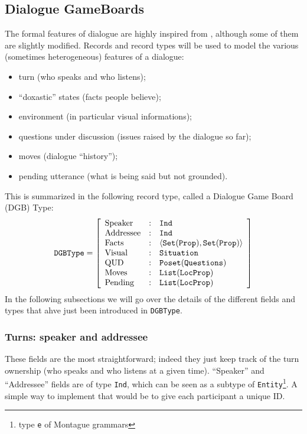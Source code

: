 \documentclass[11pt]{article}
\begin{document}
		\subsection{Dialogue GameBoards}
			The formal features of dialogue are highly inspired from \cite{ginzburg2012,ginzburg2017}, although some of them are slightly modified.
			Records and record types will be used to model the various (sometimes heterogeneous) features of a dialogue:
			\begin{itemize}
				\item turn (who speaks and who listens); \vspace{-2mm}
				\item ``doxastic'' states (facts people believe); \vspace{-2mm}
				\item environment (in particular visual informations); \vspace{-2mm}
				\item questions under discussion (issues raised by the dialogue so far); \vspace{-2mm}
				\item moves (dialogue ``history''); \vspace{-2mm}
				\item pending utterance (what is being said but not grounded).
			\end{itemize}
			This is summarized in the following record type, called a Dialogue Game Board (DGB) Type:
			\begin{equation*}
				\texttt{DGBType} =
				\left[
				\begin{array}{l l l}
				\mbox{Speaker}  &:& \texttt{Ind} \\
				\mbox{Addressee} &:& \texttt{Ind} \\
				\mbox{Facts} &:& \langle \texttt{Set}(\texttt{Prop}), \texttt{Set}(\texttt{Prop}) \rangle \\
				\mbox{Visual} &:& \texttt{Situation} \\
				\mbox{QUD}  &:& \texttt{Poset}(\texttt{Questions})\\
				\mbox{Moves}  &:& \texttt{List}(\texttt{LocProp})\\
				\mbox{Pending} &:& \texttt{List}(\texttt{LocProp})
				\end{array}
				\right ]
				\label{dgb_type}
			\end{equation*}
			In the following subsections we will go over the details of the different fields and types that ahve just been introduced in \texttt{DGBType}.
			\subsubsection{Turns: speaker and addressee}
				These fields are the most straightforward; indeed they just keep track of the turn ownership (who speaks and who listens at a given time). ``Speaker'' and ``Addressee'' fields are of type \texttt{Ind}, which can be seen as a subtype of \texttt{Entity}\footnote{type \texttt{e} of Montague grammars}. A simple way to implement that would be to give each participant a unique ID.
\end{document}
